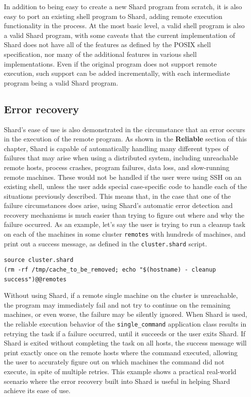 \documentclass[oneside]{report}
\begin{document}
In addition to being easy to create a new Shard program from scratch, it is also easy to port an existing shell program to Shard, adding remote execution functionality in the process.
At the most basic level, a valid shell program is also a valid Shard program, with some caveats that the current implementation of Shard does not have all of the features as defined by the POSIX shell specification, nor many of the additional features in various shell implementations.
Even if the original program does not support remote execution, such support can be added incrementally, with each intermediate program being a valid Shard program.

\subsection{Error recovery}

Shard's ease of use is also demonstrated in the circumstance that an error occurs in the execution of the remote program.
As shown in the \textbf{Reliable} section of this chapter, Shard is capable of automatically handling many different types of failures that may arise when using a distributed system, including unreachable remote hosts, process crashes, program failures, data loss, and slow-running remote machines.
These would not be handled if the user were using SSH on an existing shell, unless the user adds special case-specific code to handle each of the situations previously described.
This means that, in the case that one of the failure circumstances does arise, using Shard's automatic error detection and recovery mechanisms is much easier than trying to figure out where and why the failure occurred.
As an example, let's say the user is trying to run a cleanup task on each of the machines in some cluster \texttt{remotes} with hundreds of machines, and print out a success message, as defined in the \texttt{cluster.shard} script.

\begin{minipage}[c]{\textwidth-15pt}
  \begin{lstlisting}[language=Shard]
source cluster.shard
(rm -rf /tmp/cache_to_be_removed; echo "$(hostname) - cleanup success")@@remotes
\end{lstlisting}
  \smallskip
\end{minipage}

Without using Shard, if a remote single machine on the cluster is unreachable, the program may immediately fail and not try to continue on the remaining machines, or even worse, the failure may be silently ignored.
When Shard is used, the reliable execution behavior of the \texttt{single\_command} application class results in retrying the task if a failure occurred, until it succeeds or the user exits Shard.
If Shard is exited without completing the task on all hosts, the success message will print exactly once on the remote hosts where the command executed, allowing the user to accurately figure out on which machines the command did not execute, in spite of multiple retries.
This example shows a practical real-world scenario where the error recovery built into Shard is useful in helping Shard achieve its ease of use.
\end{document}
